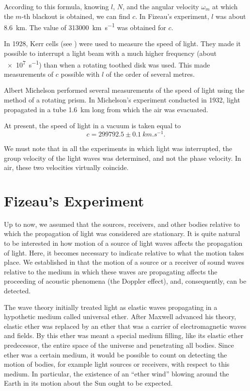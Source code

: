 \noindent
According to this formula, knowing $l$, $N$, and the angular velocity $\omega_m$ at which the $m$-th blackout is obtained, we can find $c$.
In Fizeau's experiment, $l$ was about \SI{8.6}{km}.
The value of \SI{313000}{km.s^{-1}} was obtained for $c$.

In 1928, Kerr cells (see ) were used to measure the speed of light.
They made it possible to interrupt a light beam with a much higher frequency (about \SI{e7}{s^{-1}}) than when a rotating toothed disk was used.
This made measurements of $c$ possible with $l$ of the order of several metres.

Albert Michelson performed several measurements of the speed of light using the method of a rotating prism.
In Michelson's experiment conducted in 1932, light propagated in a tube \SI{1.6}{km} long from which the air was evacuated.

At present, the speed of light in a vacuum is taken equal to
\begin{equation}\label{eq:21_2}
	c = 299792.5 \pm \SI{0.1}{km.s^{-1}}.
\end{equation}

\noindent
We must note that in all the experiments in which light was interrupted, the group velocity of the light waves was determined, and not the phase velocity.
In air, these two velocities virtually coincide.

\section{Fizeau's Experiment}\label{sec:21_2}

Up to now, we assumed that the sources, receivers, and other bodies relative to which the propagation of light was considered are stationary.
It is quite natural to be interested in how motion of a source of light waves affects the propagation of light.
Here, it becomes necessary to indicate relative to what the motion takes place.
We established in  that the motion of a source or a receiver of sound waves relative to the medium in which these waves are propagating affects the proceeding of acoustic phenomena (the Doppler effect), and, consequently, can be detected.

The wave theory initially treated light as elastic waves propagating in a hypothetic medium called universal ether.
After Maxwell advanced his theory, elastic ether was replaced by an ether that was a carrier of electromagnetic waves and fields.
By this ether was meant a special medium filling, like its elastic ether predecessor, the entire space of the universe and penetrating all bodies.
Since ether was a certain medium, it would be possible to count on detecting the motion of bodies, for example light sources or receivers, with respect to this medium.
In particular, the existence of an ``ether wind'' blowing around the Earth in its motion about the Sun ought to be expected.

